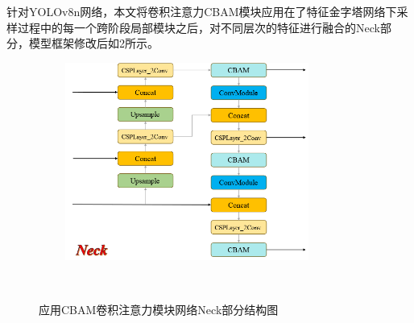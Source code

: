 \documentclass[journal]{IEEEtran}
\begin{document}
针对YOLOv8n网络，本文将卷积注意力CBAM模块应用在了特征金字塔网络下采样过程中的每一个跨阶段局部模块之后，对不同层次的特征进行融合的Neck部分，模型框架修改后如2所示。\par
\begin{figure}[htbp] 

   \centering
   \includegraphics[width=8cm]{figures/4_2.png}
   \caption{应用CBAM卷积注意力模块网络Neck部分结构图} 
   \label{fig:} 
  
\end{figure} 
\end{document}
